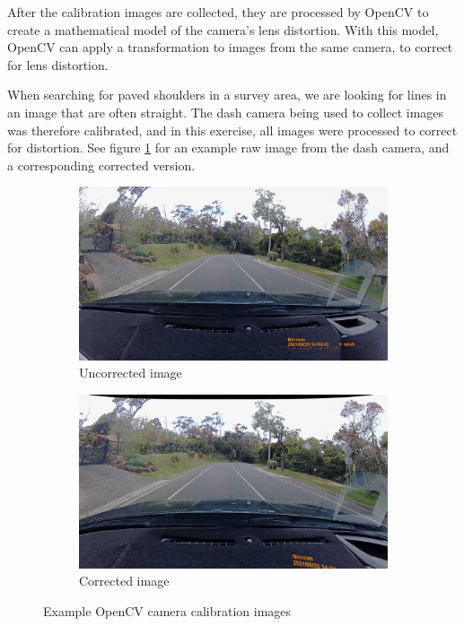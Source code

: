 \documentclass[11pt,twoside]{report}
\begin{document}
After the calibration images are collected, they are processed by OpenCV to create a mathematical model of the camera's lens distortion.  With this model, OpenCV can apply a transformation to images from the same camera, to correct for lens distortion.

When searching for paved shoulders in a survey area, we are looking for lines in an image that are often straight.  The dash camera being used to collect images was therefore calibrated, and in this exercise, all images were processed to correct for distortion.  See figure \ref{fig:008} for an example raw image from the dash camera, and a corresponding corrected version.

\begin{figure}[h]
\centering
\begin{subfigure}{0.45\textwidth}
	\includegraphics[width=\textwidth]{f008_uncorrected.png}
	\caption{Uncorrected image}
\end{subfigure}
\hfill
\begin{subfigure}{0.45\textwidth}
	\includegraphics[width=\textwidth]{f008_corrected.png}
	\caption{Corrected image}
\end{subfigure}

\caption{Example OpenCV camera calibration images}
\label{fig:008}
\end{figure}
\end{document}
